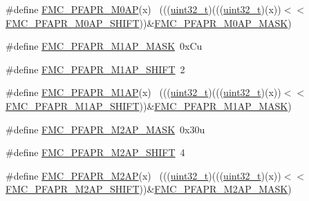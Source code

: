 \begin{DoxyCompactItemize}
\item 
\#define \hyperlink{group___f_m_c___register___masks_ga1c6e41857222a850ea33adcc2d81fa2d}{F\+M\+C\+\_\+\+P\+F\+A\+P\+R\+\_\+\+M0\+AP}(x)                                            ~(((\hyperlink{_p_e___types_8h_a33594304e786b158f3fb30289278f5af}{uint32\+\_\+t})(((\hyperlink{_p_e___types_8h_a33594304e786b158f3fb30289278f5af}{uint32\+\_\+t})(x))$<$$<$\hyperlink{group___f_m_c___register___masks_gaff9b97ca7b6e58fe7aa92c088e2f2fe1}{F\+M\+C\+\_\+\+P\+F\+A\+P\+R\+\_\+\+M0\+A\+P\+\_\+\+S\+H\+I\+FT}))\&\hyperlink{group___f_m_c___register___masks_gac1ee4a2aca52fe6f68d05ce0b43dd6b8}{F\+M\+C\+\_\+\+P\+F\+A\+P\+R\+\_\+\+M0\+A\+P\+\_\+\+M\+A\+SK})
\item 
\#define \hyperlink{group___f_m_c___register___masks_ga8b0888db1811509a1b7581445a8a1573}{F\+M\+C\+\_\+\+P\+F\+A\+P\+R\+\_\+\+M1\+A\+P\+\_\+\+M\+A\+SK}~0x\+Cu
\item 
\#define \hyperlink{group___f_m_c___register___masks_gac50a9d09140ddfce2457e804b44d2ce5}{F\+M\+C\+\_\+\+P\+F\+A\+P\+R\+\_\+\+M1\+A\+P\+\_\+\+S\+H\+I\+FT}~2
\item 
\#define \hyperlink{group___f_m_c___register___masks_gafe8518f8050c11ae0bfd9b4740c342cf}{F\+M\+C\+\_\+\+P\+F\+A\+P\+R\+\_\+\+M1\+AP}(x)                                            ~(((\hyperlink{_p_e___types_8h_a33594304e786b158f3fb30289278f5af}{uint32\+\_\+t})(((\hyperlink{_p_e___types_8h_a33594304e786b158f3fb30289278f5af}{uint32\+\_\+t})(x))$<$$<$\hyperlink{group___f_m_c___register___masks_gac50a9d09140ddfce2457e804b44d2ce5}{F\+M\+C\+\_\+\+P\+F\+A\+P\+R\+\_\+\+M1\+A\+P\+\_\+\+S\+H\+I\+FT}))\&\hyperlink{group___f_m_c___register___masks_ga8b0888db1811509a1b7581445a8a1573}{F\+M\+C\+\_\+\+P\+F\+A\+P\+R\+\_\+\+M1\+A\+P\+\_\+\+M\+A\+SK})
\item 
\#define \hyperlink{group___f_m_c___register___masks_gab3e23f648e34da06b351ac745476f30c}{F\+M\+C\+\_\+\+P\+F\+A\+P\+R\+\_\+\+M2\+A\+P\+\_\+\+M\+A\+SK}~0x30u
\item 
\#define \hyperlink{group___f_m_c___register___masks_ga05f65455021f093de56e9e086f7185ee}{F\+M\+C\+\_\+\+P\+F\+A\+P\+R\+\_\+\+M2\+A\+P\+\_\+\+S\+H\+I\+FT}~4
\item 
\#define \hyperlink{group___f_m_c___register___masks_ga601ae7a66d0d789ff410c2ad8993a9e6}{F\+M\+C\+\_\+\+P\+F\+A\+P\+R\+\_\+\+M2\+AP}(x)                                            ~(((\hyperlink{_p_e___types_8h_a33594304e786b158f3fb30289278f5af}{uint32\+\_\+t})(((\hyperlink{_p_e___types_8h_a33594304e786b158f3fb30289278f5af}{uint32\+\_\+t})(x))$<$$<$\hyperlink{group___f_m_c___register___masks_ga05f65455021f093de56e9e086f7185ee}{F\+M\+C\+\_\+\+P\+F\+A\+P\+R\+\_\+\+M2\+A\+P\+\_\+\+S\+H\+I\+FT}))\&\hyperlink{group___f_m_c___register___masks_gab3e23f648e34da06b351ac745476f30c}{F\+M\+C\+\_\+\+P\+F\+A\+P\+R\+\_\+\+M2\+A\+P\+\_\+\+M\+A\+SK})
$$
\end{DoxyCompactItemize}
